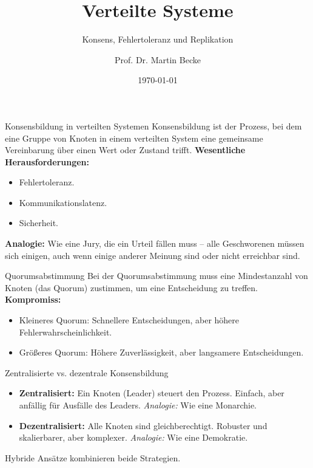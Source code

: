 \documentclass{beamer}
\title{Verteilte Systeme}
\subtitle{Konsens, Fehlertoleranz und Replikation}
\author{Prof. Dr. Martin Becke}
\date{\today}
\begin{document}
\begin{frame}
    \titlepage
\end{frame}

\begin{frame}{Konsensbildung in verteilten Systemen}
    Konsensbildung ist der Prozess, bei dem eine Gruppe von Knoten in einem verteilten System eine gemeinsame Vereinbarung über einen Wert oder Zustand trifft. \newline
    \textbf{Wesentliche Herausforderungen:}
    \begin{itemize}
        \item Fehlertoleranz.
        \item Kommunikationslatenz.
        \item Sicherheit.
    \end{itemize}
    \textbf{Analogie:} Wie eine Jury, die ein Urteil fällen muss – alle Geschworenen müssen sich einigen, auch wenn einige anderer Meinung sind oder nicht erreichbar sind.
\end{frame}

\begin{frame}{Quorumsabstimmung}
    Bei der Quorumsabstimmung muss eine Mindestanzahl von Knoten (das Quorum) zustimmen, um eine Entscheidung zu treffen. \newline
    \textbf{Kompromiss:}
    \begin{itemize}
        \item Kleineres Quorum: Schnellere Entscheidungen, aber höhere Fehlerwahrscheinlichkeit.
        \item Größeres Quorum: Höhere Zuverlässigkeit, aber langsamere Entscheidungen.
    \end{itemize}
\end{frame}

\begin{frame}{Zentralisierte vs. dezentrale Konsensbildung}
    \begin{itemize}
        \item \textbf{Zentralisiert:} Ein Knoten (Leader) steuert den Prozess. Einfach, aber anfällig für Ausfälle des Leaders. \newline \textit{Analogie:} Wie eine Monarchie.
        \item \textbf{Dezentralisiert:} Alle Knoten sind gleichberechtigt. Robuster und skalierbarer, aber komplexer. \newline \textit{Analogie:} Wie eine Demokratie.
    \end{itemize}
    Hybride Ansätze kombinieren beide Strategien.
\end{frame}
\end{document}
